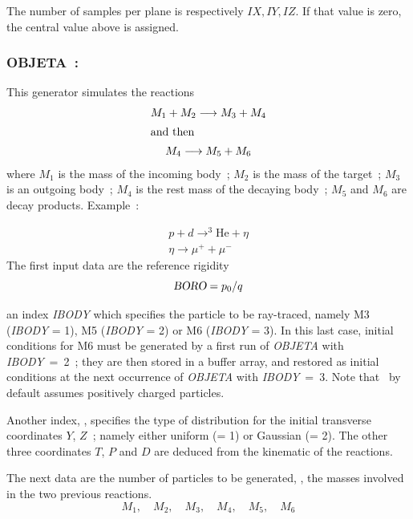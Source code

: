 \medskip

\noindent The number of samples per plane is respectively $IX, IY, IZ$.  If that value is zero, 
the central value above is assigned. 
 

\newpage


\subsubsection*{OBJETA~:   \OBJETATitl\ \protect\cite{Biblio9}}  %
\medskip 
 \label{OBJETA} 
 
This generator simulates the reactions 
%
\begin{gather*}
     M_1+M_2 \longrightarrow  M_3+M_4  \\
\intertext{and then} 
     M_4 \longrightarrow  M_5 + M_6 
\end{gather*}
%
where  $ M_1 $ is the mass of the incoming body~; $ M_2 $ is the mass
of the target~;  $ M_3 $ is an outgoing body~;  $ M_4 $ is the rest mass of the
decaying body~; $ M_5 $ and $ M_6 $ are decay products. Example~: 

  \begin{gather*}
	  p+d \longrightarrow^3 \text{He}  + \eta  \\
	 \eta  \longrightarrow  \mu^ ++ \mu^-
  \end{gather*}
%   
\noindent The first input data are the reference rigidity 
$$ \textsl{BORO} = p_0 /  q $$

\noindent an index \textsl{IBODY} which specifies the particle to be ray-traced, namely
M3 (\textsl{IBODY} = 1),  M5 (\textsl{IBODY} = 2) or M6 (\textsl{IBODY} = 3).  In this last case, 
initial conditions for M6 must be generated by a first run of \textsl{OBJETA} with 
\mbox{\textsl{IBODY} = 2}~;  they are then stored in a buffer array, and restored as initial conditions
at the next occurrence of \textsl{OBJETA} with \mbox{\textsl{IBODY} = 3}. Note that
\zgou\ by default assumes positively charged particles.  
\bigskip

\noindent Another index, \KOBJ,  specifies the type of
distribution for the initial transverse coordinates $ Y$, $Z $~;   
namely either uniform (\KOBJ = 1) or Gaussian 
(\KOBJ = 2).  The other three coordinates $ T$, $P$ and $ D $ are 
deduced from the kinematic of the reactions.   
\bigskip

\noindent The next data are the number of particles to be generated, 
\IMAX{},  the masses involved  in the two previous
reactions. 
 $$ M_1,\quad M_2,\quad M_3,\quad M_4,\quad M_5,\quad M_6 $$

